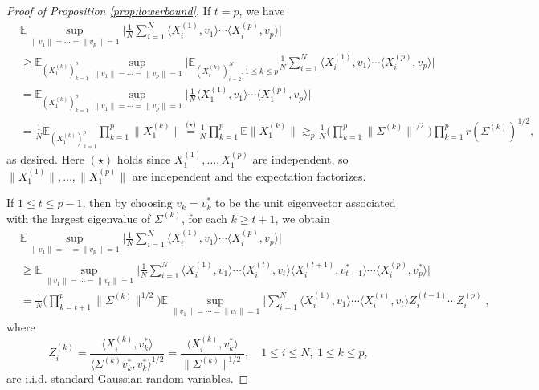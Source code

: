 \documentclass[10pt,a4paper]{amsart}
\newcommand{\E}{\mathbb{E}}
\begin{document}
\begin{proof}[Proof of Proposition \ref{prop:lowerbound}]
If $t=p$, we have
\begin{align*}
   &\E \sup_{\|v_1\|= \cdots =\|v_p\|=1} \bigg| \frac{1}{N}\sum_{i=1}^N \langle X^{(1)}_i,v_1\rangle \cdots \langle X^{(p)}_i, v_p \rangle \bigg|\\
   &\ge \E_{(X_1^{(k)})_{k=1}^{p}} \sup_{\|v_1\|= \cdots =\|v_p\|=1}  \bigg|\E_{(X_i^{(k)})_{i=2}^{N},1\le k\le p}\frac{1}{N}\sum_{i=1}^N \langle X^{(1)}_i,v_1\rangle \cdots \langle X^{(p)}_i, v_p \rangle \bigg|\\
   &=\E_{(X_1^{(k)})_{k=1}^{p}} \sup_{\|v_1\|= \cdots =\|v_p\|=1}  \bigg| \frac{1}{N} \langle X^{(1)}_1,v_1\rangle \cdots \langle X^{(p)}_1, v_p \rangle \bigg|\\
   &=\frac{1}{N}\E_{(X_1^{(k)})_{k=1}^{p}}\prod_{k=1}^{p}\|X_1^{(k)}\| \overset{\text{($\star$)}}{=} \frac{1}{N}\prod_{k=1}^{p}\E \|X_1^{(k)}\|  \gtrsim_p \frac{1}{N}  \bigg(\prod_{k=1}^p\|\Sigma^{(k)}\|^{1 / 2}\bigg) \prod_{k=1}^{p}r(\Sigma^{(k)})^{1/2},
\end{align*}
as desired. Here $(\star)$ holds since $X^{(1)}_1,\ldots, X^{(p)}_1$ are independent, so $\|X^{(1)}_1\|,\ldots, \|X^{(p)}_1\|$ are independent and the expectation factorizes.


If $1 \le t \le p-1$, then by choosing $v_k=v^{*}_k$ to be the unit eigenvector associated with the largest eigenvalue of $\Sigma^{(k)}$, for each $k \ge t+1$, we obtain 
\begin{align}\label{eq:lowerbound_aux1}
&\E \sup_{\|v_1\|= \cdots =\|v_p\|=1} \bigg| \frac{1}{N}\sum_{i=1}^N \langle X^{(1)}_i,v_1\rangle \cdots \langle X^{(p)}_i, v_p \rangle \bigg|\nonumber\\
    &\ge \E \sup_{\|v_1\|= \cdots =\|v_t\|=1} \bigg| \frac{1}{N}\sum_{i=1}^N \langle X^{(1)}_i,v_1\rangle \cdots \langle X^{(t)}_i, v_t \rangle \langle X^{(t+1)}_i, v^{*}_{t+1} \rangle\cdots \langle X^{(p)}_i, v^{*}_p \rangle\bigg| \nonumber\\
    &= \frac{1}{N}\bigg(\prod_{k=t+1}^p\|\Sigma^{(k)}\|^{1 / 2}\bigg) \E \sup_{\|v_1\|= \cdots =\|v_t\|=1} \bigg| \sum_{i=1}^N \langle X^{(1)}_i,v_1\rangle \cdots \langle X^{(t)}_i, v_t \rangle Z^{(t+1)}_i\cdots Z^{(p)}_i \bigg|,
\end{align}
where \[
Z^{(k)}_i =\frac{\langle X^{(k)}_i,v^*_k \rangle}{\langle \Sigma^{(k)} v^*_k ,v^*_k\rangle^{1/2}}=\frac{\langle X^{(k)}_i,v^*_k \rangle}{\|\Sigma^{(k)}\|^{1/2}},\quad 1\le i\le N, \ 1\le k\le p,
\]
are i.i.d. standard Gaussian random variables.


\end{proof}
\end{document}
